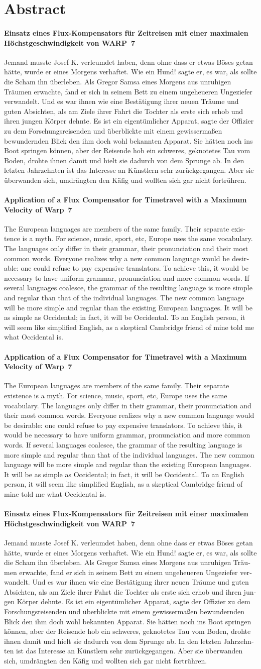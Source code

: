 \documentclass[open=right,  %
    paper=a4,               %
    fontsize=11pt,          %
    headings=small,         %
    headsepline=true,       %
    footsepline=false,      %
    bibliography=totoc,     %
    twoside=true,             %
    DIV=7,                  %
    chapterprefix=true,     %
    cleardoublepage=plain]{scrbook}
\newcommand{\frauastitelde}{Einsatz eines Flux-Kompensators für Zeitreisen mit einer maximalen Höchstgeschwindigkeit von WARP~7}
\newcommand{\frauastitelen}{Application of a Flux Compensator for Timetravel with a Maximum Velocity of Warp~7}
\newcommand{\frauasabstractde}{Jemand musste Josef K. verleumdet haben, denn ohne dass er etwas Böses getan hätte, wurde er eines Morgens verhaftet. Wie ein Hund! sagte er, es war, als sollte die Scham ihn überleben. Als Gregor Samsa eines Morgens aus unruhigen Träumen erwachte, fand er sich in seinem Bett zu einem ungeheueren Ungeziefer verwandelt. Und es war ihnen wie eine Bestätigung ihrer neuen Träume und guten Absichten, als am Ziele ihrer Fahrt die Tochter als erste sich erhob und ihren jungen Körper dehnte. Es ist ein eigentümlicher Apparat, sagte der Offizier zu dem Forschungsreisenden und überblickte mit einem gewissermaßen bewundernden Blick den ihm doch wohl bekannten Apparat. Sie hätten noch ins Boot springen können, aber der Reisende hob ein schweres, geknotetes Tau vom Boden, drohte ihnen damit und hielt sie dadurch von dem Sprunge ab. In den letzten Jahrzehnten ist das Interesse an Künstlern sehr zurückgegangen. Aber sie überwanden sich, umdrängten den Käfig und wollten sich gar nicht fortrühren.}
\newcommand{\frauasabstracten}{The European languages are members of the same family. Their separate existence is a myth. For science, music, sport, etc, Europe uses the same vocabulary. The languages only differ in their grammar, their pronunciation and their most common words. Everyone realizes why a new common language would be desirable: one could refuse to pay expensive translators. To achieve this, it would be necessary to have uniform grammar, pronunciation and more common words. If several languages coalesce, the grammar of the resulting language is more simple and regular than that of the individual languages. The new common language will be more simple and regular than the existing European languages. It will be as simple as Occidental; in fact, it will be Occidental. To an English person, it will seem like simplified English, as a skeptical Cambridge friend of mine told me what Occidental is.}
\begin{document}
\cleardoublepage

\chapter*{Abstract}

%
{
  \subsubsection*{\frauastitelde}
  \frauasabstractde
  \begin{otherlanguage}{english}
    \subsubsection*{\frauastitelen}
    \frauasabstracten
  \end{otherlanguage}
}
{
  \subsubsection*{\frauastitelen}
  \frauasabstracten
  \begin{otherlanguage}{ngerman}
    \subsubsection*{\frauastitelde}
    \frauasabstractde
  \end{otherlanguage}
} 

\cleardoublepage
{}
\tableofcontents
\cleardoublepage

\onehalfspacing


\label{lastpage}

\cleardoublepage 

\begingroup
\cleardoublepage 
\let\clearpage\relax %
\printbibliography 
\endgroup

\addchap{\frauasabbreviations}

\end{document}
